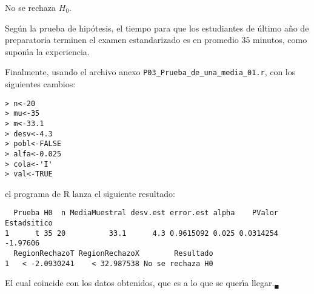 \begin{solucion}
 \begin{decision}
  No se rechaza $H_0$.
 \end{decision}

 \begin{conclusion}
  Seg\'un la prueba de hip\'otesis, el tiempo para que los estudiantes de \'ultimo a\~no de preparatoria terminen el examen estandarizado es en promedio $35$ minutos, como supon\'{\i}a la experiencia.
 \end{conclusion}

 Finalmente, usando el archivo anexo \texttt{P03\_Prueba\_de\_una\_media\_01.r}, con los siguientes cambios:
 \begin{verbatim}
> n<-20
> mu<-35
> m<-33.1
> desv<-4.3
> pobl<-FALSE
> alfa<-0.025
> cola<-'I'
> val<-TRUE
 \end{verbatim}
 \vspace{-0.5cm}
 el programa de R lanza el siguiente resultado:
 \begin{verbatim}
  Prueba H0  n MediaMuestral desv.est error.est alpha    PValor Estadsitico
1      t 35 20          33.1      4.3 0.9615092 0.025 0.0314254    -1.97606
  RegionRechazoT RegionRechazoX        Resultado
1   < -2.0930241    < 32.987538 No se rechaza H0
 \end{verbatim}
 \vspace{-0.5cm}
 El cual coincide con los datos obtenidos, que es a lo que se quer\'{\i}a llegar.${}_{\blacksquare}$
\end{solucion}
